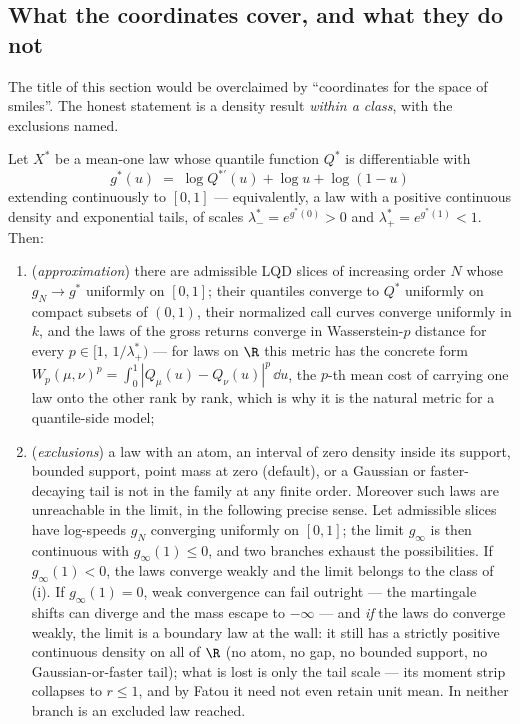 \subsection{What the coordinates cover, and what they do not}

The title of this section would be overclaimed by ``coordinates for the
space of smiles''.  The honest statement is a density result \emph{within
a class}, with the exclusions named.

\begin{proposition}
\label{prop:universal}
Let $X^{\ast}$ be a mean-one law whose quantile function $Q^{\ast}$ is
differentiable with
\[
g^{\ast}(u)\;=\;\log Q^{\ast\prime}(u)+\log u+\log(1-u)
\]
extending continuously to $[0,1]$ --- equivalently, a law with a positive
continuous density and exponential tails, of scales
$\lambda_-^{\ast}=e^{g^{\ast}(0)}>0$ and $\lambda_+^{\ast}=e^{g^{\ast}(1)}<1$.
Then:
\begin{enumerate}[leftmargin=1.6em,label=(\roman*)]
\item (\emph{approximation}) there are admissible LQD slices of increasing
order $N$ whose $g_N\to g^{\ast}$ uniformly on $[0,1]$; their quantiles
converge to $Q^{\ast}$ uniformly on compact subsets of $(0,1)$, their
normalized call curves converge uniformly in $k$, and the laws of the
gross returns converge in Wasserstein-$p$ distance for every
$p\in[1,\,1/\lambda_+^{\ast})$ --- for laws on $\R$ this metric has the
concrete form
$W_p(\mu,\nu)^{p}=\int_0^1|Q_\mu(u)-Q_\nu(u)|^{p}\,\dd u$, the $p$-th
mean cost of carrying one law onto the other rank by rank, which is why
it is the natural metric for a quantile-side model;
\item (\emph{exclusions}) a law with an atom, an interval of zero density
inside its support, bounded support, point mass at zero (default), or a
Gaussian or faster-decaying tail is not in the family at any finite
order.  Moreover such laws are unreachable in the limit, in the
following precise sense.  Let admissible slices have log-speeds $g_N$
converging uniformly on $[0,1]$; the limit $g_\infty$ is then continuous
with $g_\infty(1)\le0$, and two branches exhaust the possibilities.  If
$g_\infty(1)<0$, the laws converge weakly and the limit belongs to the
class of (i).  If $g_\infty(1)=0$, weak convergence can fail outright
--- the martingale shifts can diverge and the mass escape to $-\infty$
--- and \emph{if} the laws do converge weakly, the limit is a boundary
law at the wall: it still has a strictly positive continuous density on
all of $\R$ (no atom, no gap, no bounded support, no
Gaussian-or-faster tail); what is lost is only the tail scale --- its
moment strip collapses to $r\le1$, and by Fatou it need not even retain
unit mean.  In neither branch is an excluded law reached.
\end{enumerate}
\end{proposition}

